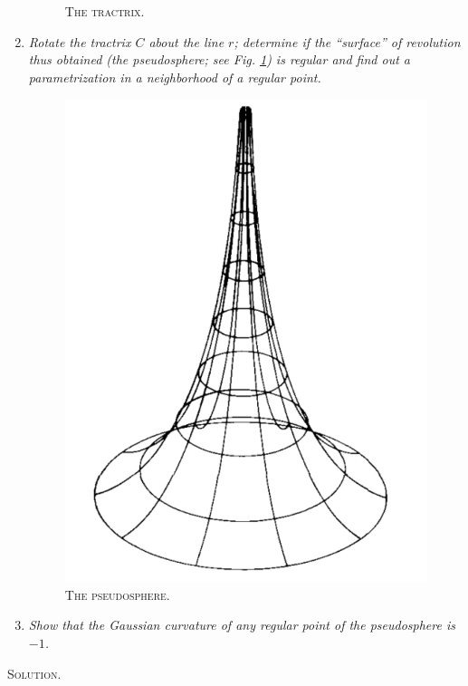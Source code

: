 \documentclass[a4paper]{article}
\numberwithin{equation}{section}
\begin{document}
\begin{enumerate}
\begin{figure}[H]
\caption{\textsc{The tractrix.}}
\end{figure}
\item \textit{Rotate the tractrix $C$ about the line $r$; determine if the ``surface'' of revolution thus obtained (the \textit{pseudosphere}; see Fig. \ref{2}) is regular and find out a parametrization in a neighborhood of a regular point.}
\begin{figure}[H]
\label{2}
\centering
\includegraphics[scale=0.43]{2}
\caption{\textsc{The pseudosphere.}}
\end{figure}
\item \textit{Show that the Gaussian curvature of any regular point of the pseudosphere is $-1$.}
\end{enumerate}
\textsc{Solution.} 
\end{document}

